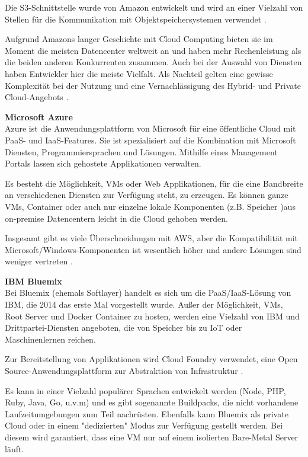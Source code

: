 Die \ac{S3}-Schnittstelle wurde von Amazon entwickelt und wird an einer Vielzahl von Stellen für die Kommunikation mit Objektspeichersystemen verwendet \parencite{aws.2017}.

Aufgrund Amazons langer Geschichte mit Cloud Computing bieten sie im Moment die meisten Datencenter weltweit an und haben mehr Rechenleistung als die beiden anderen Konkurrenten zusammen. Auch bei der Auswahl von Diensten haben Entwickler hier die meiste Vielfalt. Als Nachteil gelten eine gewisse Komplexität bei der Nutzung und eine Vernachlässigung des Hybrid- und Private Cloud-Angebots \parencite{computerworlduk.2016}.


\textbf{Microsoft Azure}\\
Azure ist die Anwendungsplattform von Microsoft für eine öffentliche Cloud mit \acs{PaaS}- und \acs{IaaS}-Features. Sie ist spezialisiert auf die Kombination mit Microsoft Diensten, Programmiersprachen und Lösungen. Mithilfe eines Management Portals lassen sich gehostete Applikationen verwalten. 

Es besteht die Möglichkeit, \acs{VM}s oder Web Applikationen, für die eine Bandbreite an verschiedenen Diensten zur Verfügung steht, zu erzeugen. Es können ganze \acs{VM}s, Container oder auch nur einzelne lokale Komponenten (z.B. Speicher )aus on-premise Datencentern leicht in die Cloud gehoben werden.

Insgesamt gibt es viele Überschneidungen mit \acs{AWS}, aber die Kompatibilität mit Microsoft/Windows-Komponenten ist wesentlich höher und andere Lösungen sind weniger vertreten \parencite{microsoft.2015}.


\textbf{IBM Bluemix}\\
Bei Bluemix (ehemals Softlayer) handelt es sich um die \acs{PaaS}/\acs{IaaS}-Lösung von IBM, die 2014 das erste Mal vorgestellt wurde. Außer der Möglichkeit, \acs{VM}s, Root Server und Docker Container zu hosten, werden eine Vielzahl von IBM und Drittpartei-Diensten angeboten, die von Speicher bis zu \ac{IoT} oder Maschinenlernen reichen.	

Zur Bereitstellung von Applikationen wird Cloud Foundry verwendet, eine Open Source-Anwendungsplattform zur Abstraktion von Infrastruktur \parencite{bluemix.2017}.

Es kann in einer Vielzahl populärer Sprachen entwickelt werden (Node, PHP, Ruby, Java, Go, u.v.m) und es gibt sogenannte Buildpacks, die nicht vorhandene Laufzeitumgebungen zum Teil nachrüsten. Ebenfalls kann Bluemix als private Cloud oder in einem "dedizierten" Modus zur Verfügung gestellt werden. Bei diesem wird garantiert, dass eine \acs{VM} nur auf einem isolierten Bare-Metal Server läuft.

